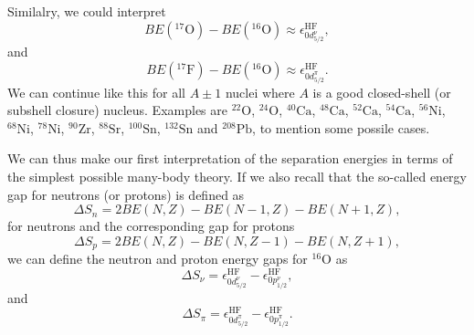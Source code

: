 \documentclass[%
oneside,                 %
final,                   %
10pt]{article}
\begin{document}
Similalry, we could interpret
\[
BE(^{17}\mathrm{O})-BE(^{16}\mathrm{O})\approx \epsilon_{0d^{\nu}_{5/2}}^{\mathrm{HF}}, 
\]
and 
\[
BE(^{17}\mathrm{F})-BE(^{16}\mathrm{O})\approx\epsilon_{0d^{\pi}_{5/2}}^{\mathrm{HF}}.
\]
We can continue like this for all $A\pm 1$ nuclei where $A$ is a good closed-shell (or subshell closure)
nucleus. Examples are ${}^{22}\mbox{O}$, ${}^{24}\mbox{O}$, ${}^{40}\mbox{Ca}$, ${}^{48}\mbox{Ca}$, ${}^{52}\mbox{Ca}$, ${}^{54}\mbox{Ca}$, ${}^{56}\mbox{Ni}$, 
${}^{68}\mbox{Ni}$, ${}^{78}\mbox{Ni}$, ${}^{90}\mbox{Zr}$, ${}^{88}\mbox{Sr}$, ${}^{100}\mbox{Sn}$, ${}^{132}\mbox{Sn}$ and ${}^{208}\mbox{Pb}$, to mention some possile cases.




We can thus make our first interpretation of the separation energies in terms of the simplest
possible many-body theory. 
If we also recall that the so-called energy gap for neutrons (or protons) is defined as
\[
\Delta S_n= 2BE(N,Z)-BE(N-1,Z)-BE(N+1,Z),
\]
for neutrons and the corresponding gap for protons
\[
\Delta S_p= 2BE(N,Z)-BE(N,Z-1)-BE(N,Z+1),
\]
we can define the neutron and proton energy gaps for ${}^{16}\mbox{O}$ as
\[
\Delta S_{\nu}=\epsilon_{0d^{\nu}_{5/2}}^{\mathrm{HF}}-\epsilon_{0p^{\nu}_{1/2}}^{\mathrm{HF}}, 
\]
and 
\[
\Delta S_{\pi}=\epsilon_{0d^{\pi}_{5/2}}^{\mathrm{HF}}-\epsilon_{0p^{\pi}_{1/2}}^{\mathrm{HF}}. 
\]
\end{document}
